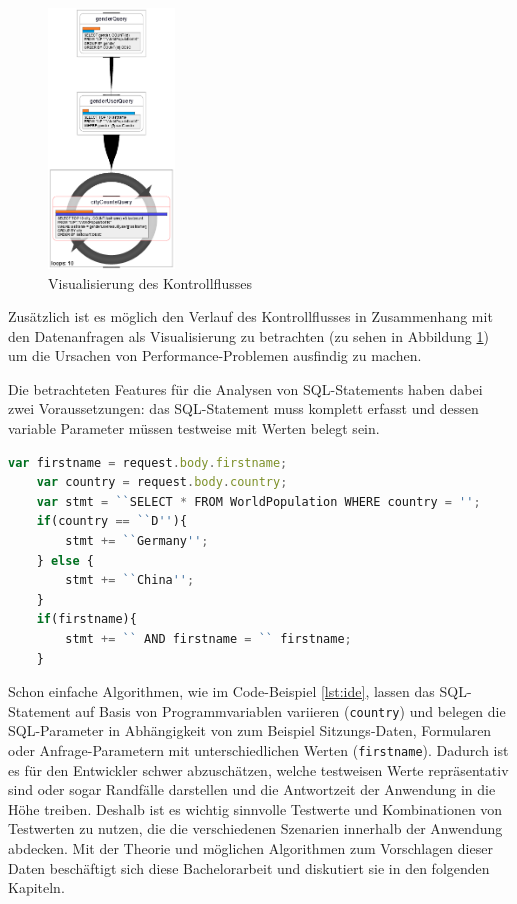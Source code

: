 \begin{figure}[ht]
	\centering
  \includegraphics[width=0.3\textwidth]{figures/feedback.png}
	\caption{Visualisierung des Kontrollflusses}
	\label{fig:feedback}
\end{figure}

Zusätzlich ist es möglich den Verlauf des Kontrollflusses in Zusammenhang mit den Datenanfragen als Visualisierung zu betrachten \cite{Frahnow2014} (zu sehen in Abbildung \ref{fig:feedback}) um die Ursachen von Performance-Problemen ausfindig zu machen.

Die betrachteten Features für die Analysen von SQL-Statements haben dabei zwei Voraussetzungen: das SQL-Statement muss komplett erfasst und dessen variable Parameter müssen testweise mit Werten belegt sein.

\begin{lstlisting}[caption={Variablen nehmen Einfluss auf die SQL-Query und -Parameter}, label={lst:ide}, language=JavaScript]
	var firstname = request.body.firstname;
	var country = request.body.country;
	var stmt = ``SELECT * FROM WorldPopulation WHERE country = '';
	if(country == ``D''){
		stmt += ``Germany'';
	} else {
		stmt += ``China'';
	}
	if(firstname){
		stmt += `` AND firstname = `` firstname;
	}
\end{lstlisting}

Schon einfache Algorithmen, wie im Code-Beispiel \ref{lst:ide}, lassen das SQL-Statement auf Basis von Programmvariablen variieren (\texttt{country}) und belegen die SQL-Parameter in Abhängigkeit von zum Beispiel Sitzungs-Daten, Formularen oder Anfrage-Parametern mit unterschiedlichen Werten (\texttt{firstname}).
Dadurch ist es für den Entwickler schwer abzuschätzen, welche testweisen Werte repräsentativ sind oder sogar Randfälle darstellen und die Antwortzeit der Anwendung in die Höhe treiben.
Deshalb ist es wichtig sinnvolle Testwerte und Kombinationen von Testwerten zu nutzen, die die verschiedenen Szenarien innerhalb der Anwendung abdecken.
Mit der Theorie und möglichen Algorithmen zum Vorschlagen dieser Daten beschäftigt sich diese Bachelorarbeit und diskutiert sie in den folgenden Kapiteln.
